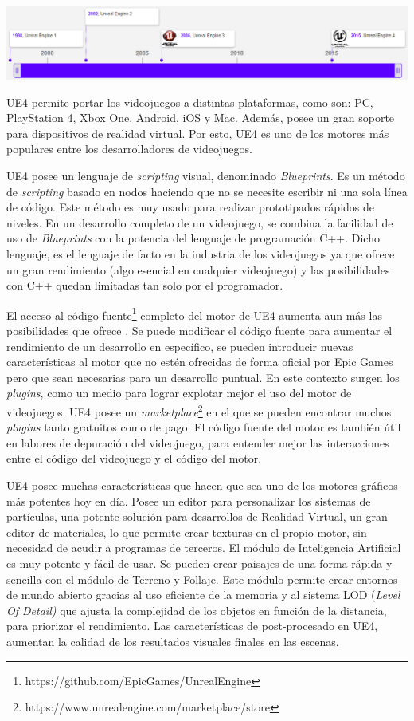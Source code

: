 \begin{center}
\includegraphics[width=15cm]{./images/timeline.png}
\end{center}

UE4 permite portar los videojuegos a distintas plataformas, como son: PC, PlayStation 4, Xbox One, Android, iOS y Mac. Además, posee un gran soporte para dispositivos de realidad virtual. Por esto, UE4 es uno de los motores más populares entre los desarrolladores de videojuegos. 

UE4 posee un lenguaje de \textit{scripting} visual, denominado \textit{Blueprints}. Es un método de \textit{scripting} basado en nodos haciendo que no se necesite escribir ni una sola línea de código. Este método es muy usado para realizar prototipados rápidos de niveles. En un desarrollo completo de un videojuego, se combina la facilidad de uso de \textit{Blueprints} con la potencia del lenguaje de programación C++. Dicho lenguaje, es el lenguaje de facto en la industria de los videojuegos ya que ofrece un gran rendimiento (algo esencial en cualquier videojuego) y las posibilidades con C++ quedan limitadas tan solo por el programador.

El acceso al código fuente\footnote{https://github.com/EpicGames/UnrealEngine} completo del motor de UE4 aumenta aun más las posibilidades que ofrece \cite{6}. Se puede modificar el código fuente para aumentar el rendimiento de un desarrollo en específico, se pueden introducir nuevas características al motor que no estén ofrecidas de forma oficial por Epic Games pero que sean necesarias para un desarrollo puntual. En este contexto surgen los \textit{plugins}, como un medio para lograr explotar mejor el uso del motor de videojuegos. UE4 posee un \textit{marketplace}\footnote{https://www.unrealengine.com/marketplace/store} en el que se pueden encontrar muchos \textit{plugins} tanto gratuitos como de pago. El código fuente del motor es también útil en labores de depuración del videojuego, para entender mejor las interacciones entre el código del videojuego y el código del motor.

UE4 posee muchas características que hacen que sea uno de los motores gráficos más potentes hoy en día. Posee un editor para personalizar los sistemas de partículas, una potente solución para desarrollos de Realidad Virtual, un gran editor de materiales, lo que permite crear texturas en el propio motor, sin necesidad de acudir a programas de terceros. El módulo de Inteligencia Artificial es muy potente y fácil de usar. Se pueden crear paisajes de una forma rápida y sencilla con el módulo de Terreno y Follaje. Este módulo permite crear entornos de mundo abierto gracias al uso eficiente de la memoria y al sistema LOD (\textit{Level Of Detail)} que ajusta la complejidad de los objetos en función de la distancia, para priorizar el rendimiento. Las características de post-procesado en UE4, aumentan la calidad de los resultados visuales finales en las escenas.

